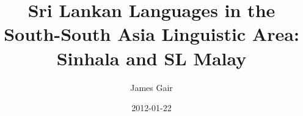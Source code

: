 \documentclass{book}
\title{Sri Lankan Languages in the South-South Asia Linguistic Area: Sinhala and SL Malay}
\author{James Gair}
\date{2012-01-22}
\begin{document}
\glossSTDmode





\end{document}
